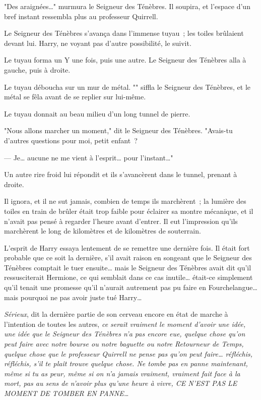 "Des araignées…" murmura le Seigneur des Ténèbres. Il soupira, et l'espace d'un bref instant ressembla plus au professeur Quirrell.

Le Seigneur des Ténèbres s'avança dans l'immense tuyau~; les toiles brûlaient devant lui. Harry, ne voyant pas d'autre possibilité, le suivit.

Le tuyau forma un Y une fois, puis une autre. Le Seigneur des Ténèbres alla à gauche, puis à droite.

Le tuyau déboucha sur un mur de métal. "" siffla le Seigneur des Ténèbres, et le métal se fêla avant de se replier sur lui-même.

Le tuyau donnait au beau milieu d'un long tunnel de pierre.

"Nous allons marcher un moment," dit le Seigneur des Ténèbres. "Avais-tu d'autres questions pour moi, petit enfant~?

--- Je… aucune ne me vient à l'esprit… pour l'instant…"

Un autre rire froid lui répondit et ils s'avancèrent dans le tunnel, prenant à droite.

Il ignora, et il ne sut jamais, combien de temps ils marchèrent~; la lumière des toiles en train de brûler était trop faible pour éclairer sa montre mécanique, et il n'avait pas pensé à regarder l'heure avant d'entrer. Il eut l'impression qu'ils marchèrent le long de kilomètres et de kilomètres de souterrain.

L'esprit de Harry essaya lentement de se remettre une dernière fois. Il était fort probable que ce soit la dernière, s'il avait raison en songeant que le Seigneur des Ténèbres comptait le tuer ensuite… mais le Seigneur des Ténèbres avait dit qu'il ressusciterait Hermione, ce qui semblait dans ce cas inutile… était-ce simplement qu'il tenait une promesse qu'il n'aurait autrement pas pu faire en Fourchelangue… mais pourquoi ne pas avoir juste tué Harry…

\emph{Sérieux}, dit la dernière partie de son cerveau encore en état de marche à l'intention de toutes les autres, \emph{ce serait vraiment le moment d'avoir une idée, une idée que le Seigneur des Ténèbres n'a pas encore eue, quelque chose qu'on peut faire avec notre bourse ou notre baguette ou notre Retourneur de Temps, quelque chose que le professeur Quirrell ne pense pas qu'on peut faire… réfléchis, réfléchis, s'il te plaît trouve quelque chose. Ne tombe pas en panne maintenant, même si tu as peur, même si on n'a jamais vraiment, vraiment fait face à la mort, pas au sens de n'avoir plus qu'une heure à vivre, CE N'EST PAS LE MOMENT DE TOMBER EN PANNE…}

